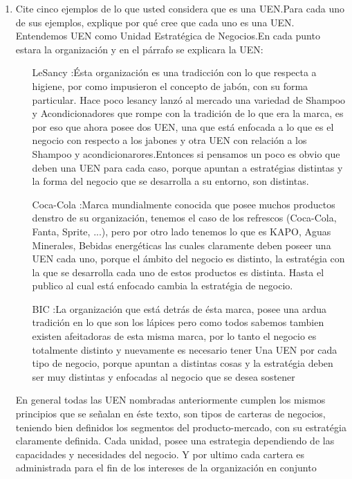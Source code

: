\begin{itemize}
\begin{enumerate}
		\item Cite cinco ejemplos de lo que usted considera que es una UEN.Para cada uno de sus ejemplos, explique por qu\'e cree que cada uno es una UEN.\\
		Entendemos UEN como Unidad Estrat\'egica de Negocios.En cada punto estara la organizaci\'on y en el p\'arrafo se explicara la UEN:		\begin{enumerate}
			\item[LeSancy]:\'Esta organizaci\'on es una tradicci\'on con lo que respecta a higiene, por como impusieron el concepto
				de jab\'on, con su forma particular. Hace poco lesancy lanz\'o al mercado una variedad de Shampoo y Acondicionadores
				que rompe con la tradici\'on de lo que era la marca, es por eso que ahora posee dos UEN, una que est\'a enfocada
				a lo que es el negocio con respecto a los jabones y otra UEN con relaci\'on a los Shampoo y acondicionarores.Entonces
				si pensamos un poco es obvio que deben una UEN para cada caso, porque apuntan a estrat\'egias distintas y la forma
				del negocio que se desarrolla a su entorno, son distintas.
			\item[Coca-Cola]:Marca mundialmente conocida que posee muchos productos denstro de su organizaci\'on, tenemos el caso de los
				refrescos (Coca-Cola, Fanta, Sprite, ...), pero por otro lado tenemos lo que es KAPO, Aguas Minerales, Bebidas
				energ\'eticas las cuales claramente deben poseer una UEN cada uno, porque el \'ambito del negocio es distinto, 
				la estrat\'egia con la que se desarrolla cada uno de estos productos es distinta. Hasta el publico al cual est\'a
				enfocado cambia la estrat\'egia de negocio.
			\item[BIC]:La organizaci\'on que est\'a detr\'as de \'esta marca, posee una ardua tradici\'on en lo que son los l\'apices
				pero como todos sabemos tambien existen afeitadoras de esta misma marca, por lo tanto el negocio es totalmente distinto
				y nuevamente es necesario tener Una UEN por cada tipo de negocio, porque apuntan a distintas cosas y la estrat\'egia deben
				ser muy distintas y enfocadas al negocio que se desea sostener
		\end{enumerate} 
		En general todas las UEN nombradas anteriormente cumplen los mismos principios que se se\~nalan en \'este texto, son tipos de carteras
		de negocios, teniendo bien definidos los segmentos del producto-mercado, con su estrat\'egia claramente definida.
		Cada unidad, posee una estrategia dependiendo de las capacidades y necesidades del negocio.
		Y por ultimo cada cartera es administrada para el fin de los intereses de la organizaci\'on en conjunto
	\end{enumerate}


\end{itemize}
